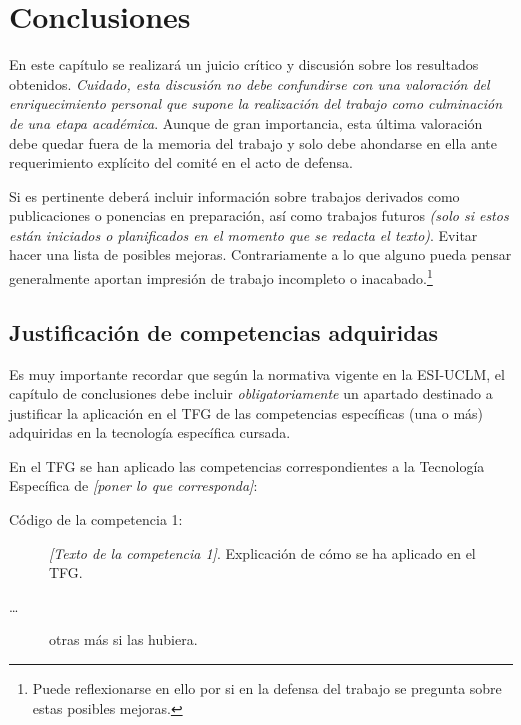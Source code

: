 \chapter{Conclusiones}
\label{cap:Conclusiones}

En este capítulo se realizará un juicio crítico y discusión sobre los resultados obtenidos. \emph{Cuidado, esta discusión no debe confundirse con una valoración del enriquecimiento personal que supone la realización del trabajo como culminación de una etapa académica}. Aunque de gran importancia, esta última valoración debe quedar fuera de la memoria del trabajo y solo debe ahondarse en ella ante requerimiento explícito del comité en el acto de defensa.

Si es pertinente deberá incluir información sobre trabajos derivados como publicaciones o ponencias en preparación, así como trabajos futuros \emph{(solo si estos están iniciados o planificados en el momento que se redacta el texto)}. Evitar hacer una lista de posibles mejoras. Contrariamente a lo que alguno pueda pensar generalmente aportan impresión de trabajo incompleto o inacabado.\footnote{Puede reflexionarse en ello por si en la defensa del trabajo se pregunta sobre estas posibles mejoras.}


\section{Justificación de competencias adquiridas}
Es muy importante recordar que según la normativa vigente en la ESI-UCLM, el capítulo de conclusiones debe incluir \emph{obligatoriamente} un apartado destinado a justificar la aplicación en el TFG de las competencias específicas (una o más) adquiridas en la tecnología específica cursada.

En el TFG se han aplicado las competencias correspondientes a la Tecnología Específica de \emph{[poner lo que corresponda]}:

\begin{description}
\item[Código de la competencia 1:] \emph{[Texto de la competencia 1]}. Explicación de cómo se ha aplicado en el TFG.
\item[\dots] otras más si las hubiera.
\end{description}






